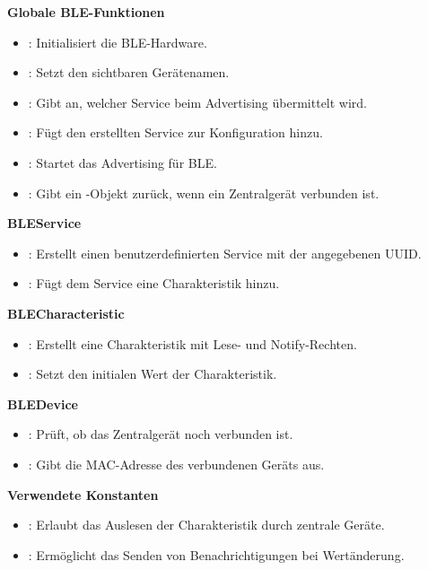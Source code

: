 \textbf{Globale BLE-Funktionen}
\begin{itemize}
	\item {}: Initialisiert die BLE-Hardware.
	\item {}: Setzt den sichtbaren Gerätenamen.
	\item {}: Gibt an, welcher Service beim Advertising übermittelt wird.
	\item {}: Fügt den erstellten Service zur Konfiguration hinzu.
	\item {}: Startet das Advertising für BLE.
	\item {}: Gibt ein -Objekt zurück, wenn ein Zentralgerät verbunden ist.
\end{itemize}

\textbf{BLEService}
\begin{itemize}
	\item {}: Erstellt einen benutzerdefinierten Service mit der angegebenen UUID.
	\item {}: Fügt dem Service eine Charakteristik hinzu.
\end{itemize}

\textbf{BLECharacteristic}
\begin{itemize}
	\item {}: Erstellt eine Charakteristik mit Lese- und Notify-Rechten.
	\item {}: Setzt den initialen Wert der Charakteristik.
\end{itemize}

\textbf{BLEDevice}
\begin{itemize}
	\item {}: Prüft, ob das Zentralgerät noch verbunden ist.
	\item {}: Gibt die MAC-Adresse des verbundenen Geräts aus.
\end{itemize}

\textbf{Verwendete Konstanten}
\begin{itemize}
	\item {}: Erlaubt das Auslesen der Charakteristik durch zentrale Geräte.
	\item {}: Ermöglicht das Senden von Benachrichtigungen bei Wertänderung.
\end{itemize}

